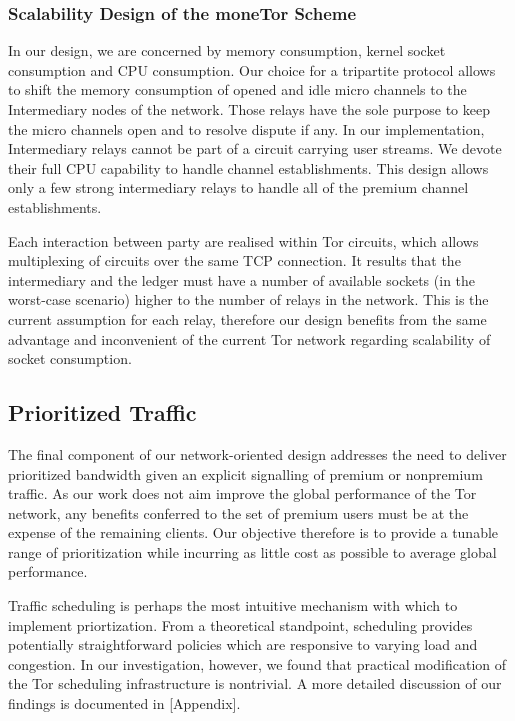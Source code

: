\subsubsection{Scalability Design of the moneTor Scheme}
\label{subsub:scalability}

In our design, we are concerned by memory consumption, kernel socket consumption and CPU consumption. Our choice for a tripartite protocol allows to shift the memory consumption of opened and idle micro channels to the Intermediary nodes of the network. Those relays have the sole purpose to keep the micro channels open and to resolve dispute if any. In our implementation, Intermediary relays cannot be part of a circuit carrying user streams. We devote their full CPU capability to handle channel establishments. This design allows only a few strong intermediary relays to handle all of the premium channel establishments.

Each interaction between party are realised within Tor circuits, which allows
multiplexing of circuits over the same TCP connection. It results that the
intermediary and the ledger must have a number of available sockets (in the
worst-case scenario) higher to the number of relays in the network. This is the
current assumption for each relay, therefore our design benefits from the same
advantage and inconvenient of the current Tor network regarding scalability of
socket consumption.

\subsection{Prioritized Traffic}
\label{subsub:prioritized}

The final component of our network-oriented design addresses the need to deliver
prioritized bandwidth given an explicit signalling of premium or nonpremium
traffic. As our work does not aim improve the global performance of the Tor
network, any benefits conferred to the set of premium users must be at the
expense of the remaining clients. Our objective therefore is to provide a
tunable range of prioritization while incurring as little cost as possible to
average global performance.

Traffic scheduling is perhaps the most intuitive mechanism with which to
implement priortization. From a theoretical standpoint, scheduling provides
potentially straightforward policies which are responsive to varying load and
congestion. In our investigation, however, we found that practical modification
of the Tor scheduling infrastructure is nontrivial. A more detailed discussion
of our findings is documented in [Appendix].

